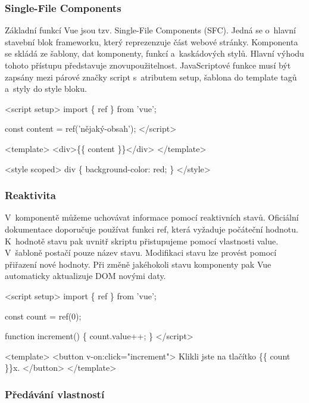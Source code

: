 \subsubsection{Single-File Components}

Základní funkcí Vue jsou tzv. Single-File Components (SFC). Jedná se o~hlavní stavební blok frameworku, který reprezenzuje část webové stránky. 
Komponenta se skládá ze šablony, dat komponenty, funkcí a~kaskádových stylů. Hlavní výhodu tohoto přístupu představuje znovupoužitelnost. 
JavaScriptové funkce musí být zapsány mezi párové značky script s~atributem setup, šablona do template tagů a~styly do style bloku.\cite{vuemacrae,vue}

\begin{prog}
<script setup>
  import \{ ref \} from 'vue';
  
  const content = ref('nějaký-obsah');
</script>
  
<template>
  <div>\{\{ content \}\}</div>
</template>
  
<style scoped>
  div \{
    background-color: red;
  \}
</style>
\end{prog}

\subsubsection{Reaktivita}

V~komponentě můžeme uchovávat informace pomocí reaktivních stavů. Oficiální dokumentace doporučuje používat funkci ref, která vyžaduje počáteční hodnotu. 
K~hodnotě stavu pak uvnitř skriptu přistupujeme pomocí vlastnosti value. V~šabloně postačí pouze název stavu. 
Modifikaci stavu lze provést pomocí přiřazení nové hodnoty. Při změně jakéhokoli stavu komponenty pak Vue automaticky aktualizuje DOM novými daty.\cite{vue}

\begin{prog}
<script setup>
  import \{ ref \} from 'vue';
  
  const count = ref(0);

  function increment() \{
    count.value++;
  \}
</script>
  
<template>
  <button v-on:click="increment">
    Klikli jste na tlačítko \{\{ count \}\}x.
  </button>
</template>
\end{prog}

\subsubsection{Předávání vlastností}

